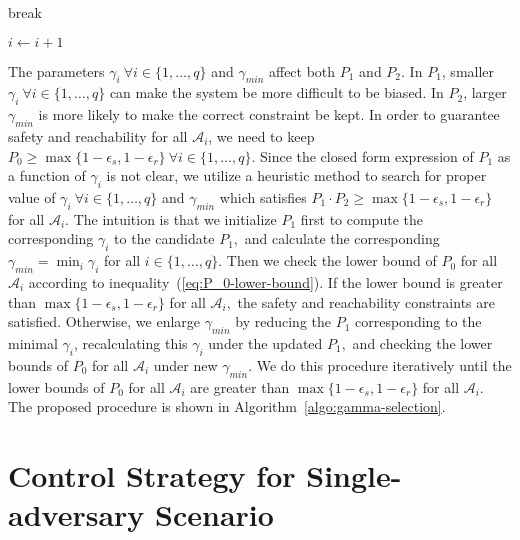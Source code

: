 \documentclass[journal]{IEEEtran}
\begin{document}
\begin{algorithm}[h]
\begin{algorithmic}[1]
		        \State break
		    \EndIf
		    
		    \State $i \leftarrow i + 1$
		\EndWhile
            
            \State {}
        \EndIf
       
        \State {}
        \EndProcedure
	 \end{algorithmic}
\end{algorithm}

The parameters $\gamma_i \ \forall i \in \{1,\ldots,q\}$ and $\gamma_{min}$ affect both $P_1$ and $P_2.$ In $P_1$, smaller $\gamma_{i} \ \forall i \in \{1,\ldots,q\}$ can make the system be more difficult to be biased. In $P_2$, larger $\gamma_{min}$ is more likely to make the correct constraint be kept. In order to guarantee safety and reachability for all $\mathcal{A}_i$, we need to keep $P_0 \geq \max \{1-\epsilon_s, 1-\epsilon_r\} \ \forall i \in \{1,\ldots,q\}$. Since the closed form expression of $P_1$ as a function of $\gamma_{i}$ is not clear, we utilize a heuristic method to search for proper value of $\gamma_i \ \forall i \in \{1,\ldots,q\}$ and $\gamma_{min}$ which satisfies $P_1 \cdot P_2 \geq \max \{1-\epsilon_s, 1-\epsilon_r\}$ for all $\mathcal{A}_i.$ The intuition is that we initialize $P_1$ first to compute the corresponding $\gamma_{i}$ to the candidate $P_1,$ and calculate the corresponding $\gamma_{min} = \min_{i} \gamma_i$ for all $i \in \{1,\ldots,q\}.$ Then we check the lower bound of $P_0$ for all $\mathcal{A}_i$ according to inequality~(\ref{eq:P_0-lower-bound}). If the lower bound is greater than $\max \{1-\epsilon_s, 1-\epsilon_r\}$ for all $\mathcal{A}_i,$ the safety and reachability constraints are satisfied. Otherwise, we enlarge $\gamma_{min}$ by reducing the $P_1$ corresponding to the minimal $\gamma_i$, recalculating this $\gamma_i$ under the updated $P_1,$ and checking the lower bounds of $P_0$ for all $\mathcal{A}_i$ under new $\gamma_{min}.$ We do this procedure iteratively until the lower bounds of $P_0$ for all $\mathcal{A}_i$ are greater than $\max \{1-\epsilon_s, 1-\epsilon_r\}$ for all $\mathcal{A}_i.$ The proposed procedure is shown in Algorithm~\ref{algo:gamma-selection}.



\section{Control Strategy for Single-adversary Scenario}
\label{Single-adversarial-scenario}
\end{document}
